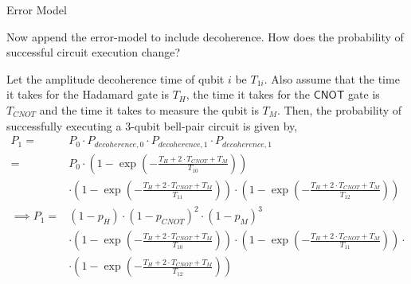 \begin{solution}{Error Model}
    \begin{question}
        Now append the error-model to include decoherence. How does the probability of successful circuit execution change?
    \end{question}
    \begin{answer}
        Let the amplitude decoherence time of qubit $i$ be $T_{1i}$. Also assume that the time it takes for the Hadamard gate is $T_H$, the time it takes for the $\mathsf{CNOT}$ gate is $T_{CNOT}$ and the time it takes to measure the qubit is $T_M$. Then, the probability of successfully executing a $3$-qubit bell-pair circuit is given by,
        \begin{equation}
            \begin{split}
                P_1 = &P_0\cdot P_{decoherence,0}\cdot P_{decoherence,1}\cdot P_{decoherence,1}\\
                = &P_0\cdot \left(1 - \exp\left(-\frac{T_H + 2\cdot T_{CNOT} + T_M}{T_{10}}\right)\right)\\
                & \cdot \left(1 - \exp\left(-\frac{T_H + 2\cdot T_{CNOT} + T_M}{T_{11}}\right)\right)\cdot \left(1 - \exp\left(-\frac{T_H + 2\cdot T_{CNOT} + T_M}{T_{12}}\right)\right)\\
                \implies P_1 = & (1-p_H)\cdot(1-p_{CNOT})^2\cdot(1-p_M)^3\\
                & \cdot \left(1 - \exp\left(-\frac{T_H + 2\cdot T_{CNOT} + T_M}{T_{10}}\right)\right)\cdot \left(1 - \exp\left(-\frac{T_H + 2\cdot T_{CNOT} + T_M}{T_{11}}\right)\right)\cdot\\
                & \cdot \left(1 - \exp\left(-\frac{T_H + 2\cdot T_{CNOT} + T_M}{T_{12}}\right)\right)
            \end{split}
        \end{equation}
    \end{answer}

    \tcbline


\end{solution}
